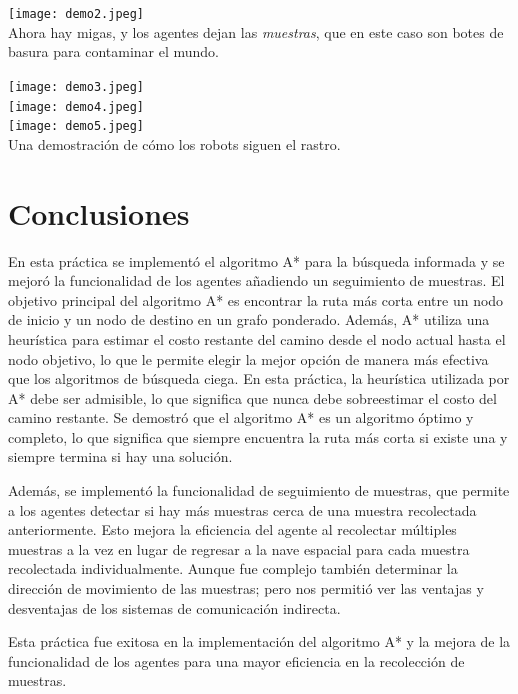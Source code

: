 \documentclass{article}
\begin{document}
\texttt{[image: demo2.jpeg]}\\
Ahora hay migas, y los agentes dejan las \emph{muestras}, que en este caso son botes de basura para contaminar el mundo.

\texttt{[image: demo3.jpeg]}\\
\texttt{[image: demo4.jpeg]}\\
\texttt{[image: demo5.jpeg]}\\
Una demostración de cómo los robots siguen el rastro.

\section{Conclusiones}
En esta práctica se implementó el algoritmo A* para la búsqueda informada y se mejoró la funcionalidad de los agentes añadiendo un seguimiento de muestras. El objetivo principal del algoritmo A* es encontrar la ruta más corta entre un nodo de inicio y un nodo de destino en un grafo ponderado. Además, A* utiliza una heurística para estimar el costo restante del camino desde el nodo actual hasta el nodo objetivo, lo que le permite elegir la mejor opción de manera más efectiva que los algoritmos de búsqueda ciega. En esta práctica, la heurística utilizada por A* debe ser admisible, lo que significa que nunca debe sobreestimar el costo del camino restante. Se demostró que el algoritmo A* es un algoritmo óptimo y completo, lo que significa que siempre encuentra la ruta más corta si existe una y siempre termina si hay una solución.

Además, se implementó la funcionalidad de seguimiento de muestras, que permite a los agentes detectar si hay más muestras cerca de una muestra recolectada anteriormente. Esto mejora la eficiencia del agente al recolectar múltiples muestras a la vez en lugar de regresar a la nave espacial para cada muestra recolectada individualmente. Aunque fue complejo también determinar la dirección de movimiento de las muestras; pero nos permitió ver las ventajas y desventajas de los sistemas de comunicación indirecta.

Esta práctica fue exitosa en la implementación del algoritmo A* y la mejora de la funcionalidad de los agentes para una mayor eficiencia en la recolección de muestras. 
\end{document}
